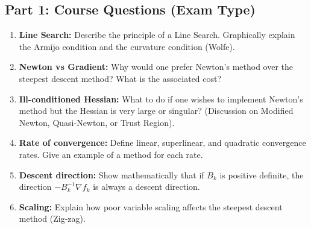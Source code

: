 \subsection*{Part 1: Course Questions (Exam Type)}
\bigskip
\begin{exercice}
\begin{enumerate}
    \item \textbf{Line Search:} Describe the principle of a Line Search. Graphically explain the Armijo condition and the curvature condition (Wolfe).
    \item \textbf{Newton vs Gradient:} Why would one prefer Newton's method over the steepest descent method? What is the associated cost?
    \item \textbf{Ill-conditioned Hessian:} What to do if one wishes to implement Newton's method but the Hessian is very large or singular? (Discussion on Modified Newton, Quasi-Newton, or Trust Region).
    \item \textbf{Rate of convergence:} Define linear, superlinear, and quadratic convergence rates. Give an example of a method for each rate.
    \item \textbf{Descent direction:} Show mathematically that if $B_k$ is positive definite, the direction $-B_k^{-1} \nabla f_k$ is always a descent direction.
    \item \textbf{Scaling:} Explain how poor variable scaling affects the steepest descent method (Zig-zag).
\end{enumerate}
\end{exercice}


